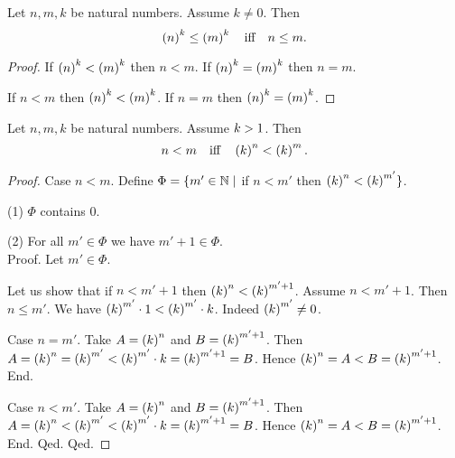\documentclass[../arithmetic.tex]{subfiles}
\begin{document}
  \begin{forthel}
    \begin{corollary}
      Let $n, m, k$ be natural numbers.
      Assume $k \neq 0$.
      Then \[ \left(n\right)^{k} \leq \left(m\right)^{k} \quad \text{iff} \quad n \leq m. \]
    \end{corollary}
    \begin{proof}
      If $\left(n\right)^{k} < \left(m\right)^{k}$ then $n \less m$.
      If $\left(n\right)^{k} = \left(m\right)^{k}$ then $n = m$.

      If $n \less m$ then $\left(n\right)^{k} < \left(m\right)^{k}$.
      If $n = m$ then $\left(n\right)^{k} = \left(m\right)^{k}$.
    \end{proof}
  \end{forthel}

  \begin{forthel}
    \begin{proposition}
      Let $n, m, k$ be natural numbers.
      Assume $k > 1$.
      Then \[ n < m \quad \text{iff} \quad \left(k\right)^{n} < \left(k\right)^{m}. \]
    \end{proposition}
    \begin{proof}
      Case $n \less m$.
        Define $\Phi = \{ m' \in \mathbb{N} \mid$ if $n \less m'$ then
        $\left(k\right)^{n} < \left(k\right)^{m'} \}$.

        (1) $\Phi$ contains $0$.

        (2) For all $m' \in \Phi$ we have $m' \plus 1 \in \Phi$. \\
        Proof.
          Let $m' \in \Phi$.

          Let us show that if $n \less m' \plus 1$ then $\left(k\right)^{n} < \left(k\right)^{m' + 1}$.
            Assume $n \less m' \plus 1$.
            Then $n \leq m'$.
            We have $\left(k\right)^{m'} \cdot 1 < \left(k\right)^{m'} \cdot k$.
            Indeed $\left(k\right)^{m'} \neq 0$.

            Case $n = m'$.
              Take $A = \left(k\right)^{n}$ and $B = \left(k\right)^{m' + 1}$. %
              Then $A
                = \left(k\right)^{n}
                = \left(k\right)^{m'}
                < \left(k\right)^{m'} \cdot k
                = \left(k\right)^{m' + 1}
                = B$.
              Hence $\left(k\right)^{n} = A < B = \left(k\right)^{m' + 1}$.
            End.

            Case $n \less m'$.
              Take $A = \left(k\right)^{n}$ and $B = \left(k\right)^{m' + 1}$. %
              Then $A
                = \left(k\right)^{n}
                < \left(k\right)^{m'}
                < \left(k\right)^{m'} \cdot k
                = \left(k\right)^{m' + 1}
                = B$.
              Hence $\left(k\right)^{n} = A < B = \left(k\right)^{m' + 1}$.
            End.
          Qed.
        Qed.


\end{proof}
\end{forthel}
\end{document}
